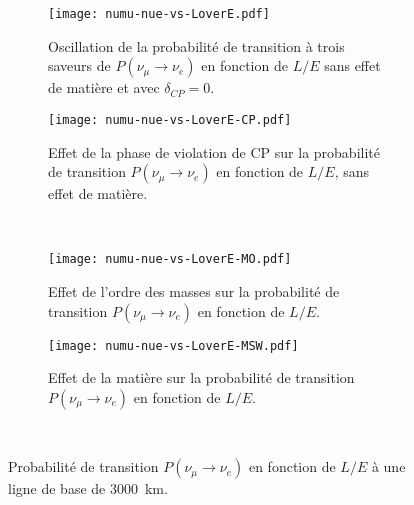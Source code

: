       \begin{figure}[htpb]
        \centering
        \begin{subfigure}[t]{0.49\textwidth}
          \centering
          \texttt{[image: numu-nue-vs-LoverE.pdf]}
          \caption{\label{fig::3flav_oscillation_vanilla}Oscillation de la probabilité de transition à trois saveurs de $P(\nu_{\mu}\to\nu_e)$ en fonction de $L/E$ sans effet de matière et avec $\delta_{CP}=0$.}
        \end{subfigure}\hfill
        \begin{subfigure}[t]{0.49\textwidth}
          \centering
          \texttt{[image: numu-nue-vs-LoverE-CP.pdf]}
          \caption{\label{fig::3flav_oscillation_cp}Effet de la phase de violation de CP sur la probabilité de transition $P(\nu_{\mu}\to\nu_e)$ en fonction de $L/E$, sans effet de matière.}
        \end{subfigure}\\
        \begin{subfigure}[t]{0.49\textwidth}
          \centering
          \texttt{[image: numu-nue-vs-LoverE-MO.pdf]}
          \caption{\label{fig::3flav_oscillation_ordering}Effet de l'ordre des masses sur la probabilité de transition $P(\nu_{\mu}\to\nu_e)$ en fonction de $L/E$.}
        \end{subfigure}\hfill
        \begin{subfigure}[t]{0.49\textwidth}
          \centering
          \texttt{[image: numu-nue-vs-LoverE-MSW.pdf]}
          \caption{\label{fig::3flav_oscillation_matter}Effet de la matière sur la probabilité de transition $P(\nu_{\mu}\to\nu_e)$ en fonction de $L/E$.}
        \end{subfigure}\\
        \caption{\label{fig::3flav_oscillation}Probabilité de transition $P(\nu_{\mu}\to\nu_e)$ en fonction de $L/E$ à une ligne de base de \SI{3000}{\kilo\meter}.}
      \end{figure}

